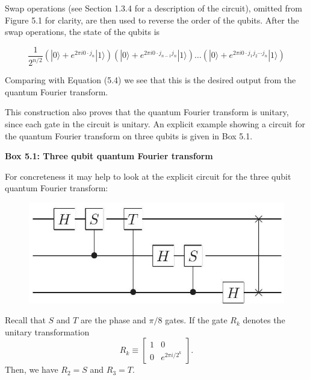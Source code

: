 Swap operations (see Section 1.3.4 for a description of the circuit), omitted from Figure 5.1 for clarity, are then used to reverse the order of the qubits. After the swap operations, the state of the qubits is

\begin{equation*}
\frac{1}{2^{n / 2}}\left(|0\rangle+e^{2 \pi i 0 \cdot j_{n}}|1\rangle\right)\left(|0\rangle+e^{2 \pi i 0 \cdot j_{n-1} j_{n}}|1\rangle\right) \ldots\left(|0\rangle+e^{2 \pi i 0 \cdot j_{1} j_{2} \cdots j_{n}}|1\rangle\right) \tag{5.18}
\end{equation*}

Comparing with Equation (5.4) we see that this is the desired output from the quantum Fourier transform. 

This construction also proves that the quantum Fourier transform is unitary, since each gate in the circuit is unitary. An explicit example showing a circuit for the quantum Fourier transform on three qubits is given in Box 5.1.

\textbf{Box 5.1: Three qubit quantum Fourier transform}

For concreteness it may help to look at the explicit circuit for the three qubit quantum Fourier transform: 
\begin{figure}     
\centering
\includegraphics[width=0.75\linewidth]{Images/2024_05_17_6977ce60de6fd27aef98g-254}
\end{figure}
Recall that $S$ and $T$ are the phase and $\pi / 8$ gates. If the gate $R_{k}$ denotes the unitary transformation
\begin{equation*}
R_{k} \equiv\left[\begin{array}{cc}
1 & 0  \tag{5.11}\\
0 & e^{2 \pi i / 2^{k}}
\end{array}\right].
\end{equation*}
Then, we have $R_2=S$ and $R_3=T.$

